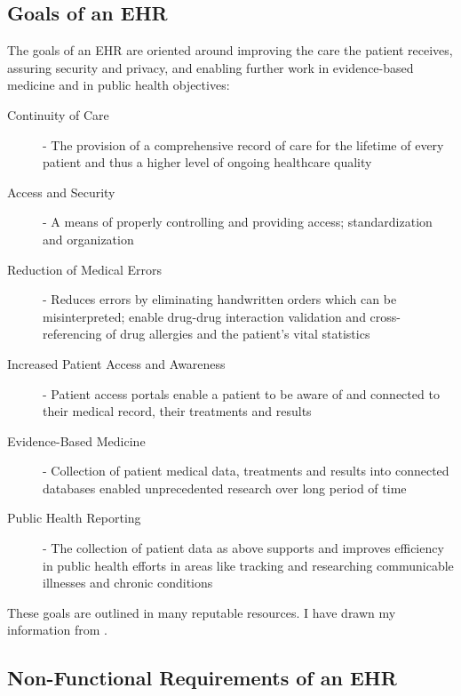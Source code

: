 \documentclass[10pt]{article}
\begin{document}
\subsection{Goals of an EHR}
\label{sec:Goals of an EHR}

The goals of an EHR are oriented around improving the care the patient receives, assuring security and privacy, and enabling further work in evidence-based medicine and in public health objectives: 
\begin{description}
\item[Continuity of Care] - The provision of a comprehensive record of care for the lifetime of every patient and thus a higher level of ongoing healthcare quality
\item[Access and Security] - A means of properly controlling and providing access; standardization and organization
\item[Reduction of Medical Errors] - Reduces errors by eliminating handwritten orders which can be misinterpreted; enable drug-drug interaction validation and cross-referencing of drug allergies and the patient's vital statistics
\item[Increased Patient Access and Awareness] - Patient access portals enable a patient to be aware of and connected to their medical record, their treatments and results
\item[Evidence-Based Medicine] - Collection of patient medical data, treatments and results into connected databases enabled unprecedented research over long period of time
\item[Public Health Reporting] - The collection of patient data as above supports and improves efficiency in public health efforts in areas like tracking and researching communicable illnesses and chronic conditions
\end{description}

These goals are outlined in many reputable resources. I have drawn my information from \cite{ehrbook}.

\subsection{Non-Functional Requirements of an EHR}
\label{sec:NFR of an EHR}
\end{document}
